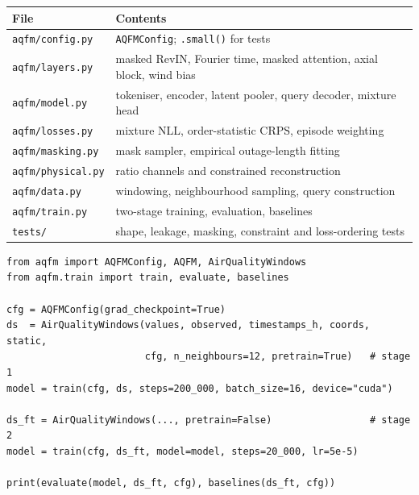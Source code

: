 \documentclass[11pt,a4paper]{article}
\begin{document}
\begin{table}[h]
\centering
\small
\begin{tabular}{@{}ll@{}}
\toprule
File & Contents \\
\midrule
\texttt{aqfm/config.py}  & \texttt{AQFMConfig}; \texttt{.small()} for tests \\
\texttt{aqfm/layers.py}  & masked RevIN, Fourier time, masked attention, axial block, wind bias \\
\texttt{aqfm/model.py}   & tokeniser, encoder, latent pooler, query decoder, mixture head \\
\texttt{aqfm/losses.py}  & mixture NLL, order-statistic CRPS, episode weighting \\
\texttt{aqfm/masking.py} & mask sampler, empirical outage-length fitting \\
\texttt{aqfm/physical.py}& ratio channels and constrained reconstruction \\
\texttt{aqfm/data.py}    & windowing, neighbourhood sampling, query construction \\
\texttt{aqfm/train.py}   & two-stage training, evaluation, baselines \\
\texttt{tests/}          & shape, leakage, masking, constraint and loss-ordering tests \\
\bottomrule
\end{tabular}
\end{table}

\begin{lstlisting}[caption={Minimal usage.}]
from aqfm import AQFMConfig, AQFM, AirQualityWindows
from aqfm.train import train, evaluate, baselines

cfg = AQFMConfig(grad_checkpoint=True)
ds  = AirQualityWindows(values, observed, timestamps_h, coords, static,
                        cfg, n_neighbours=12, pretrain=True)   # stage 1
model = train(cfg, ds, steps=200_000, batch_size=16, device="cuda")

ds_ft = AirQualityWindows(..., pretrain=False)                 # stage 2
model = train(cfg, ds_ft, model=model, steps=20_000, lr=5e-5)

print(evaluate(model, ds_ft, cfg), baselines(ds_ft, cfg))
\end{lstlisting}
\end{document}
